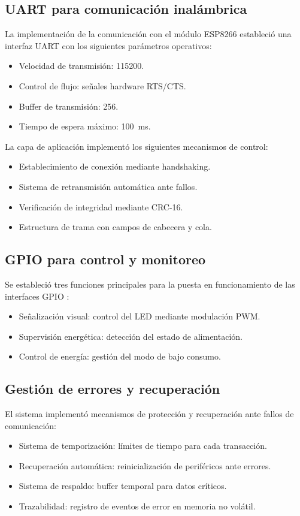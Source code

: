 \subsection{UART para comunicación inalámbrica}
La implementación de la comunicación con el módulo ESP8266 estableció una interfaz UART con los siguientes parámetros operativos:
\begin{itemize}
	\item Velocidad de transmisión: \SI{115200}{\baud}.
	\item Control de flujo: señales hardware RTS/CTS.
	\item Buffer de transmisión: \SI{256}{\byte}.
	\item Tiempo de espera máximo: \SI{100}{\milli\second}.
\end{itemize}
La capa de aplicación implementó los siguientes mecanismos de control:
\begin{itemize}
	\item Establecimiento de conexión mediante handshaking.
	\item Sistema de retransmisión automática ante fallos.
	\item Verificación de integridad mediante CRC-16.
	\item Estructura de trama con campos de cabecera y cola.
\end{itemize}

\subsection{GPIO para control y monitoreo}
Se estableció tres funciones principales para la puesta en funcionamiento de las interfaces GPIO :
\begin{itemize}
	\item Señalización visual: control del LED mediante modulación PWM.
	\item Supervisión energética: detección del estado de alimentación.
	\item Control de energía: gestión del modo de bajo consumo.
\end{itemize}
\subsection{Gestión de errores y recuperación}
El sistema implementó mecanismos de protección y recuperación ante fallos de comunicación:
\begin{itemize}
	\item Sistema de temporización: límites de tiempo para cada transacción.
	\item Recuperación automática: reinicialización de periféricos ante errores.
	\item Sistema de respaldo: buffer temporal para datos críticos.
	\item Trazabilidad: registro de eventos de error en memoria no volátil.
\end{itemize}

